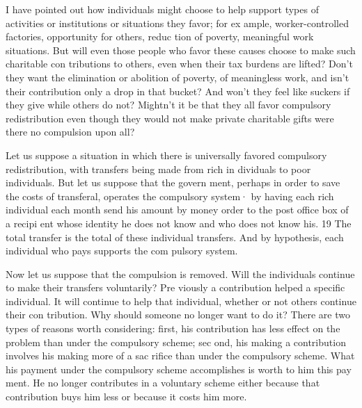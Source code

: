 \documentclass[11pt,openany]{book}
\begin{document}
I have pointed out how individuals might choose to help support types of activities or institutions or situations they favor; for ex ample, worker-controlled factories, opportunity for others, reduc tion of poverty, meaningful work situations. But will even those people who favor these causes choose to make such charitable con tributions to others, even when their tax burdens are lifted? Don't they want the elimination or abolition of poverty, of meaningless work, and isn't their contribution only a drop in that bucket? And won't they feel like suckers if they give while others do not? Mightn't it be that they all favor compulsory redistribution even though they would not make private charitable gifts were there no compulsion upon all? 

Let us suppose a situation in which there is universally favored compulsory redistribution, with transfers being made from rich in dividuals to poor individuals. But let us suppose that the govern ment, perhaps in order to save the costs of transferal, operates the compulsory system· by having each rich individual each month send his amount by money order to the post office box of a recipi ent whose identity he does not know and who does not know his. 19 The total transfer is the total of these individual transfers. And by hypothesis, each individual who pays supports the com pulsory system. 

Now let us suppose that the compulsion is removed. Will the individuals continue to make their transfers voluntarily? Pre viously a contribution helped a specific individual. It will continue to help that individual, whether or not others continue their con tribution. Why should someone no longer want to do it? There are two types of reasons worth considering: first, his contribution has less effect on the problem than under the compulsory scheme; sec ond, his making a contribution involves his making more of a sac rifice than under the compulsory scheme. What his payment under the compulsory scheme accomplishes is worth to him this pay ment. He no longer contributes in a voluntary scheme either because that contribution buys him less or because it costs him more. 
\end{document}
